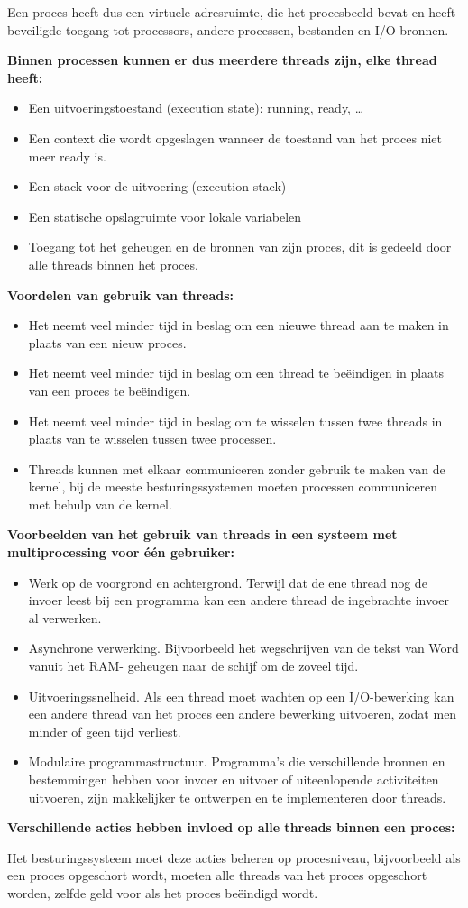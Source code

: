 Een proces heeft dus een virtuele adresruimte, die het procesbeeld bevat en heeft beveiligde toegang tot processors, andere processen, bestanden en I/O-bronnen.

\textbf{Binnen processen kunnen er dus meerdere threads zijn, elke thread heeft:}

\begin{itemize}
\item Een uitvoeringstoestand (execution state): running, ready, …
\item Een context die wordt opgeslagen wanneer de toestand van het proces niet meer ready is.
\item Een stack voor de uitvoering (execution stack)
\item Een statische opslagruimte voor lokale variabelen
\item Toegang tot het geheugen en de bronnen van zijn proces, dit is gedeeld door alle threads binnen het proces.
\end{itemize}

\textbf{Voordelen van gebruik van threads:}

\begin{itemize}
\item Het neemt veel minder tijd in beslag om een nieuwe thread aan te maken in plaats van een nieuw proces.
\item Het neemt veel minder tijd in beslag om een thread te beëindigen in plaats van een proces te beëindigen.
\item Het neemt veel minder tijd in beslag om te wisselen tussen twee threads in plaats van te wisselen tussen twee processen.
\item Threads kunnen met elkaar communiceren zonder gebruik te maken van de kernel, bij de meeste besturingssystemen moeten processen communiceren met behulp van de kernel.
\end{itemize}

\textbf{Voorbeelden van het gebruik van threads in een systeem met multiprocessing voor één gebruiker:}

\begin{itemize}
\item Werk op de voorgrond en achtergrond. Terwijl dat de ene thread nog de invoer leest bij een programma kan een andere thread de ingebrachte invoer al verwerken.
\item Asynchrone verwerking. Bijvoorbeeld het wegschrijven van de tekst van Word vanuit het RAM- geheugen naar de schijf om de zoveel tijd.
\item Uitvoeringssnelheid. Als een thread moet wachten op een I/O-bewerking kan een andere thread van het proces een andere bewerking uitvoeren, zodat men minder of geen tijd verliest.
\item Modulaire programmastructuur. Programma’s die verschillende bronnen en bestemmingen hebben voor invoer en uitvoer of uiteenlopende activiteiten uitvoeren, zijn makkelijker te ontwerpen en te implementeren door threads.
\end{itemize}

\textbf{Verschillende acties hebben invloed op alle threads binnen een proces:}

Het besturingssysteem moet deze acties beheren op procesniveau, bijvoorbeeld als een proces opgeschort wordt, moeten alle threads van het proces opgeschort worden, zelfde geld voor als het proces beëindigd wordt.



